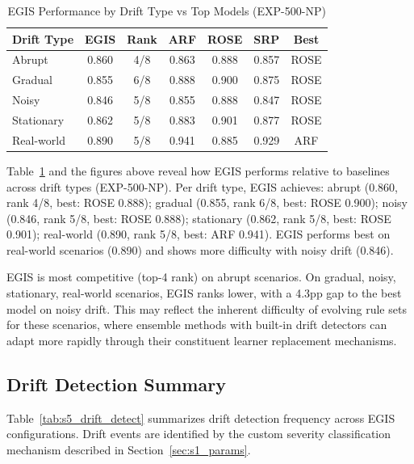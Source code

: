 \documentclass[lettersize,10pt]{article}
\begin{document}
\begin{table}[htbp]
\centering
\caption{EGIS Performance by Drift Type vs Top Models (EXP-500-NP)}
\label{tab:s5_drift_ranking}
\footnotesize
\begin{tabular}{lcccccc}
\toprule
\textbf{Drift Type} & \textbf{EGIS} & \textbf{Rank} & \textbf{ARF} & \textbf{ROSE} & \textbf{SRP} & \textbf{Best} \\
\midrule
Abrupt & 0.860 & 4/8 & 0.863 & 0.888 & 0.857 & ROSE \\
Gradual & 0.855 & 6/8 & 0.888 & 0.900 & 0.875 & ROSE \\
Noisy & 0.846 & 5/8 & 0.855 & 0.888 & 0.847 & ROSE \\
Stationary & 0.862 & 5/8 & 0.883 & 0.901 & 0.877 & ROSE \\
Real-world & 0.890 & 5/8 & 0.941 & 0.885 & 0.929 & ARF \\
\bottomrule
\end{tabular}
\end{table}

Table~\ref{tab:s5_drift_ranking} and the figures above reveal how EGIS performs relative to baselines across drift types (EXP-500-NP). Per drift type, EGIS achieves: abrupt (0.860, rank 4/8, best: ROSE 0.888); gradual (0.855, rank 6/8, best: ROSE 0.900); noisy (0.846, rank 5/8, best: ROSE 0.888); stationary (0.862, rank 5/8, best: ROSE 0.901); real-world (0.890, rank 5/8, best: ARF 0.941). 
EGIS performs best on real-world scenarios (0.890) and shows more difficulty with noisy drift (0.846). 

EGIS is most competitive (top-4 rank) on abrupt scenarios. 
On gradual, noisy, stationary, real-world scenarios, EGIS ranks lower, with a 4.3pp gap to the best model on noisy drift. This may reflect the inherent difficulty of evolving rule sets for these scenarios, where ensemble methods with built-in drift detectors can adapt more rapidly through their constituent learner replacement mechanisms.

\subsection{Drift Detection Summary}
\label{sec:s5_drift_detect}
Table~\ref{tab:s5_drift_detect} summarizes drift detection frequency across EGIS configurations. Drift events are identified by the custom severity classification mechanism described in Section~\ref{sec:s1_params}.
\end{document}
